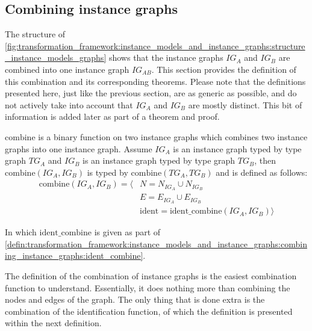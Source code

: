 \subsection{Combining instance graphs}
\label{subsec:transformation_framework:instance_models_and_instance_graphs:combining_instance_graphs}

The structure of \cref{fig:transformation_framework:instance_models_and_instance_graphs:structure_instance_models_graphs} shows that the instance graphs $IG_A$ and $IG_B$ are combined into one instance graph $IG_{AB}$. This section provides the definition of this combination and its corresponding theorems. Please note that the definitions presented here, just like the previous section, are as generic as possible, and do not actively take into account that $IG_{A}$ and $IG_{B}$ are mostly distinct. This bit of information is added later as part of a theorem and proof.

\begin{defin}
\label{defin:transformation_framework:instance_models_and_instance_graphs:combining_instance_graphs:combine}
$\mathrm{combine}$ is a binary function on two instance graphs which combines two instance graphs into one instance graph. Assume $IG_A$ is an instance graph typed by type graph $TG_A$ and $IG_B$ is an instance graph typed by type graph $TG_B$, then $\mathrm{combine}(IG_A, IG_B)$ is typed by $\mathrm{combine}(TG_A, TG_B)$ and is defined as follows:
\begin{align*}
\mathrm{combine}(IG_A, IG_B) = \langle&
N = N_{IG_A} \cup N_{IG_B} \\&
E = E_{IG_A} \cup E_{IG_B} \\&
\mathrm{ident} = \mathrm{ident\_\!combine}(IG_A, IG_B) \rangle
\end{align*}

In which $\mathrm{ident\_\!combine}$ is given as part of \cref{defin:transformation_framework:instance_models_and_instance_graphs:combining_instance_graphs:ident_combine}.
\end{defin}

The definition of the combination of instance graphs is the easiest combination function to understand. Essentially, it does nothing more than combining the nodes and edges of the graph. The only thing that is done extra is the combination of the identification function, of which the definition is presented within the next definition.

